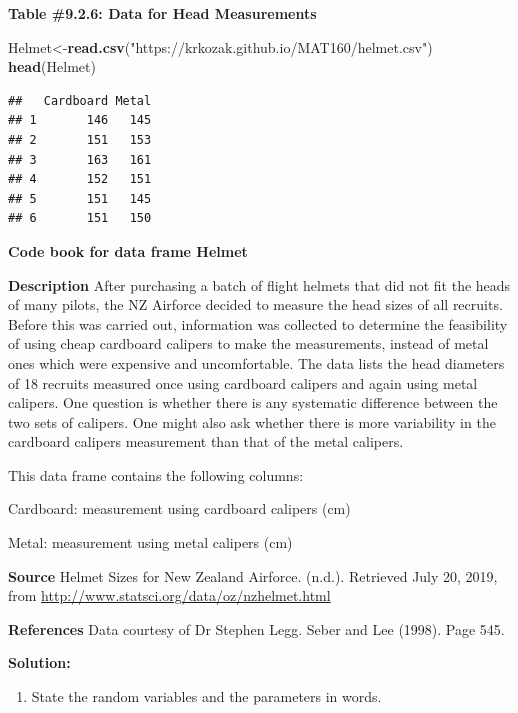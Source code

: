 \documentclass[]{book}
\newenvironment{Shaded}{\begin{snugshade}}{\end{snugshade}}
\newcommand{\KeywordTok}[1]{\textcolor[rgb]{0.13,0.29,0.53}{\textbf{#1}}}
\newcommand{\NormalTok}[1]{#1}
\newcommand{\StringTok}[1]{\textcolor[rgb]{0.31,0.60,0.02}{#1}}
\providecommand{\tightlist}{%
  \setlength{\itemsep}{0pt}\setlength{\parskip}{0pt}}
\begin{document}
\textbf{Table \#9.2.6: Data for Head Measurements}

\begin{Shaded}
\begin{Highlighting}[]
\NormalTok{Helmet<-}\KeywordTok{read.csv}\NormalTok{(}\StringTok{"https://krkozak.github.io/MAT160/helmet.csv"}\NormalTok{)}
\KeywordTok{head}\NormalTok{(Helmet)}
\end{Highlighting}
\end{Shaded}

\begin{verbatim}
##   Cardboard Metal
## 1       146   145
## 2       151   153
## 3       163   161
## 4       152   151
## 5       151   145
## 6       151   150
\end{verbatim}

\textbf{Code book for data frame Helmet}

\textbf{Description}
After purchasing a batch of flight helmets that did not fit the heads of many pilots, the NZ Airforce decided to measure the head sizes of all recruits. Before this was carried out, information was collected to determine the feasibility of using cheap cardboard calipers to make the measurements, instead of metal ones which were expensive and uncomfortable. The data lists the head diameters of 18 recruits measured once using cardboard calipers and again using metal calipers. One question is whether there is any systematic difference between the two sets of calipers. One might also ask whether there is more variability in the cardboard calipers measurement than that of the metal calipers.

This data frame contains the following columns:

Cardboard: measurement using cardboard calipers (cm)

Metal: measurement using metal calipers (cm)

\textbf{Source}
Helmet Sizes for New Zealand Airforce. (n.d.). Retrieved July 20, 2019, from \url{http://www.statsci.org/data/oz/nzhelmet.html}

\textbf{References}
Data courtesy of Dr Stephen Legg. Seber and Lee (1998). Page 545.

\textbf{Solution:}

\begin{enumerate}
\def\labelenumi{\arabic{enumi}.}
\tightlist
\item
  State the random variables and the parameters in words.
\end{enumerate}
\end{document}
